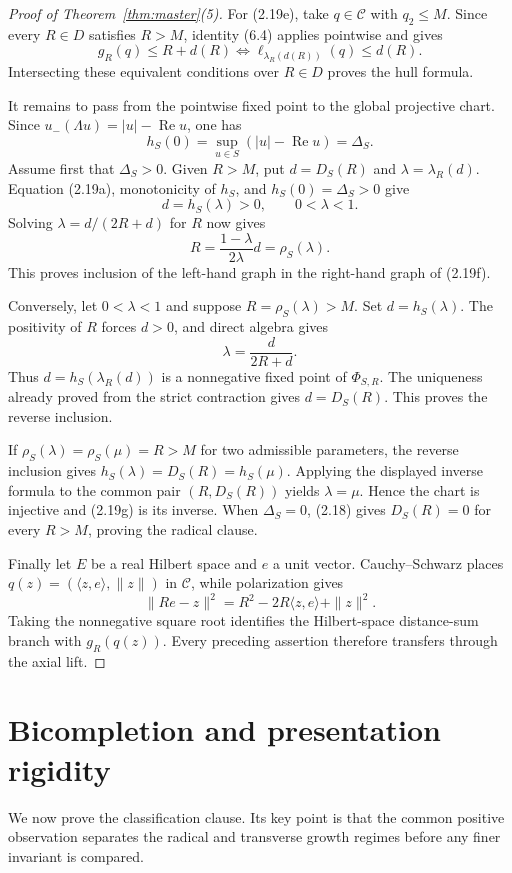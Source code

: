 \documentclass[11pt]{article}
\theoremstyle{remark}
\newcommand{\Rea}{\operatorname{Re}}
\begin{document}
\begin{proof}[Proof of Theorem~\ref{thm:master}(5)]
For (2.19e), take $q\in\mathcal C$ with $q_2\le M$.  Since every $R\in D$ satisfies $R>M$,
identity (6.4) applies pointwise and gives
\[
 g_R(q)\le R+d(R)
 \Longleftrightarrow
 \ell_{\lambda_R(d(R))}(q)\le d(R).
\]
Intersecting these equivalent conditions over $R\in D$ proves the hull formula.

It remains to pass from the pointwise fixed point to the global projective chart.  Since
$u_-(\Lambda u)=|u|-\Rea u$, one has
\[
 h_S(0)=\sup_{u\in S}(|u|-\Rea u)=\Delta_S.
\]
Assume first that $\Delta_S>0$.  Given $R>M$, put $d=D_S(R)$ and
$\lambda=\lambda_R(d)$.  Equation (2.19a), monotonicity of $h_S$, and
$h_S(0)=\Delta_S>0$ give
\[
 d=h_S(\lambda)>0,
 \qquad 0<\lambda<1.
\]
Solving $\lambda=d/(2R+d)$ for $R$ now gives
\[
 R=\frac{1-\lambda}{2\lambda}d
  =\rho_S(\lambda).
\]
This proves inclusion of the left-hand graph in the right-hand graph of (2.19f).

Conversely, let $0<\lambda<1$ and suppose $R=\rho_S(\lambda)>M$.  Set
$d=h_S(\lambda)$.  The positivity of $R$ forces $d>0$, and direct algebra gives
\[
 \lambda=\frac d{2R+d}.
\]
Thus $d=h_S(\lambda_R(d))$ is a nonnegative fixed point of $\Phi_{S,R}$.  The uniqueness already
proved from the strict contraction gives $d=D_S(R)$.  This proves the reverse inclusion.

If $\rho_S(\lambda)=\rho_S(\mu)=R>M$ for two admissible parameters, the reverse inclusion gives
$h_S(\lambda)=D_S(R)=h_S(\mu)$.  Applying the displayed inverse formula to the common pair
$(R,D_S(R))$ yields $\lambda=\mu$.  Hence the chart is injective and (2.19g) is its inverse.
When $\Delta_S=0$, (2.18) gives $D_S(R)=0$ for every $R>M$, proving the radical clause.

Finally let $E$ be a real Hilbert space and $e$ a unit vector.  Cauchy--Schwarz places
$q(z)=(\langle z,e\rangle,\|z\|)$ in $\mathcal C$, while polarization gives
\[
 \|R e-z\|^2=R^2-2R\langle z,e\rangle+\|z\|^2.
\]
Taking the nonnegative square root identifies the Hilbert-space distance-sum branch with
$g_R(q(z))$.  Every preceding assertion therefore transfers through the axial lift.
\end{proof}

\section{Bicompletion and presentation rigidity}
\label{sec:rigidity}

We now prove the classification clause.  Its key point is that the common positive observation
separates the radical and transverse growth regimes before any finer invariant is compared.
\end{document}
